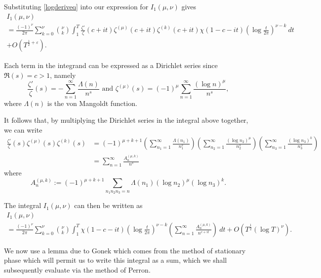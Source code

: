 \documentclass[12pt, a4paper,reqno]{amsart}
\theoremstyle{definition}
\numberwithin{equation}{section}
\begin{document}
Substituting \eqref{logderiveq} into our expression for $I_1(\mu,\nu)$ gives
\begin{multline*}
    I_1(\mu,\nu)\\
    =\frac{(-1)^{\nu}}{2\pi}\sum_{k=0}^{\nu} \binom{\nu}{k} \int_1^T\frac{\zeta'}{\zeta}(c+it)\zeta^{(\mu)}(c+it)\zeta^{(k)}(c+it)\chi(1-c-it)\left( \log\frac{t}{2\pi}\right)^{\nu-k} \ dt \\
    +O\left(T^{\frac{1}{2}+\varepsilon} \right).
\end{multline*}


Each term in the integrand can be expressed as a Dirichlet series since $\Re(s)=c>1$, namely 
\begin{equation*}
    \frac{\zeta'}{\zeta}(s)=-\sum_{n=1}^{\infty}\frac{\Lambda(n)}{n^s} \text{ and }
    \zeta^{(\mu)}(s)=(-1)^{\mu}\sum_{n=1}^{\infty}\frac{(\log n)^{\mu}}{n^s},
\end{equation*}
where $\Lambda(n)$ is the von Mangoldt function.

It follows that, by multiplying the Dirichlet series in the integral above together, we can write
\begin{align*}
    \frac{\zeta'}{\zeta}(s)\zeta^{(\mu)}(s)\zeta^{(k)}(s) &= (-1)^{\mu+k+1}\left(\sum_{n_1=1}^{\infty}\frac{\Lambda(n_1)}{n_1^s}\right)\left(\sum_{n_2=1}^{\infty}\frac{(\log n_2)^{\mu}}{n_2^s}\right)\left(\sum_{n_3=1}^{\infty}\frac{(\log n_3)^k}{n_3^s}\right) \\
    &=\sum_{n=1}^{\infty}\frac{A_n^{(\mu,k)}}{n^s}
\end{align*}
where
\begin{equation}\label{eq:Def_A_k_mu_k}
    A_n^{(\mu,k)}:=(-1)^{\mu+k+1}\sum_{n_1n_2n_3=n}\Lambda(n_1)(\log n_2)^{\mu}(\log n_3)^k .
\end{equation}


The integral $I_1(\mu, \nu)$ can then be written as
\begin{multline*}
    I_1(\mu,\nu)\\
    =\frac{(-1)^{\nu}}{2\pi} \sum_{k=0}^{\nu} \binom{\nu}{k} \int_1^T\chi(1-c-it)\left( \log\frac{t}{2\pi}\right)^{\nu-k} \left( \sum_{n=1}^{\infty} \frac{A_n^{(\mu,k)}}{n^{c+it}}\right) \ dt+O\left(T^{\frac{1}{2}}(\log T)^{\nu}\right).
\end{multline*}

We now use a lemma due to Gonek \cite[Lemma 5]{Gonek1984} which comes from the method of stationary phase which will permit us to write this integral as a sum, which we shall subsequently evaluate via the method of Perron.
\end{document}
